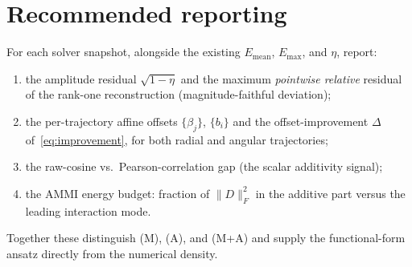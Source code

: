 \documentclass{article}
\begin{document}
\section{Recommended reporting}

For each solver snapshot, alongside the existing $E_{\mathrm{mean}}$,
$E_{\max}$, and $\eta$, report:
\begin{enumerate}
\item the amplitude residual $\sqrt{1-\eta}$ and the maximum \emph{pointwise
relative} residual of the rank-one reconstruction (magnitude-faithful
deviation);
\item the per-trajectory affine offsets $\{\beta_{j}\}$, $\{b_{i}\}$ and the
offset-improvement $\Delta$ of~\eqref{eq:improvement}, for both radial and
angular trajectories;
\item the raw-cosine vs.\ Pearson-correlation gap (the scalar additivity
signal);
\item the AMMI energy budget: fraction of $\|D\|_{F}^{2}$ in the additive part
versus the leading interaction mode.
\end{enumerate}
Together these distinguish (M), (A), and (M+A) and supply the functional-form
ansatz directly from the numerical density.
\end{document}
